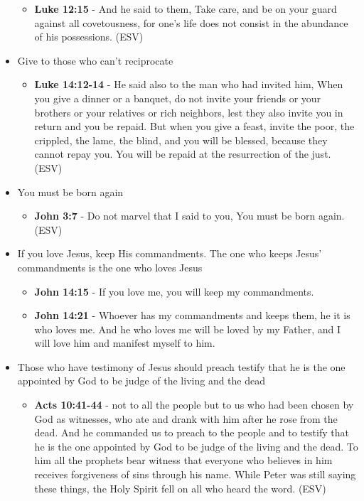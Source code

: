 \documentclass[11pt]{article}
\begin{document}
\begin{itemize}
\begin{itemize}
\item \textbf{Luke 12:15} - And he said to them, Take care, and be on your guard against all covetousness, for one's life does not consist in the abundance of his possessions. (ESV)
\end{itemize}
\item Give to those who can't reciprocate
\begin{itemize}
\item \textbf{Luke 14:12-14} - He said also to the man who had invited him, When you give a dinner or a banquet, do not invite your friends or your brothers or your relatives or rich neighbors, lest they also invite you in return and you be repaid. But when you give a feast, invite the poor, the crippled, the lame, the blind, and you will be blessed, because they cannot repay you. You will be repaid at the resurrection of the just. (ESV)
\end{itemize}
\item You must be born again
\begin{itemize}
\item \textbf{John 3:7} - Do not marvel that I said to you, You must be born again. (ESV)
\end{itemize}
\item If you love Jesus, keep His commandments. The one who keeps Jesus' commandments is the one who loves Jesus
\begin{itemize}
\item \textbf{John 14:15} - If you love me, you will keep my commandments.
\item \textbf{John 14:21} - Whoever has my commandments and keeps them, he it is who loves me. And he who loves me will be loved by my Father, and I will love him and manifest myself to him.
\end{itemize}
\item Those who have testimony of Jesus should preach testify that he is the one appointed by God to be judge of the living and the dead
\begin{itemize}
\item \textbf{Acts 10:41-44} - not to all the people but to us who had been chosen by God as witnesses, who ate and drank with him after he rose from the dead. And he commanded us to preach to the people and to testify that he is the one appointed by God to be judge of the living and the dead. To him all the prophets bear witness that everyone who believes in him receives forgiveness of sins through his name. While Peter was still saying these things, the Holy Spirit fell on all who heard the word. (ESV)

\end{itemize}
\end{itemize}
\end{document}
